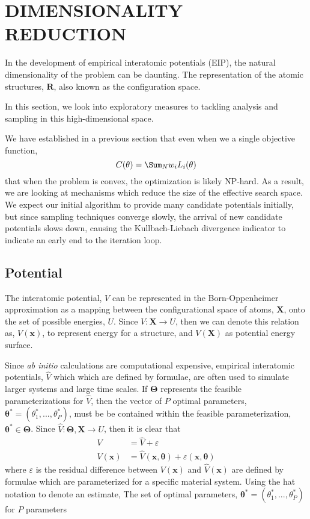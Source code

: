 \chapter{DIMENSIONALITY REDUCTION}

In the development of empirical interatomic potentials (EIP), the natural dimensionality of the problem can be daunting.  The representation of the atomic structures, $\bm{R}$, also known as the configuration space.

In this section, we look into exploratory measures to tackling analysis and sampling in this high-dimensional space.

We have established in a previous section that even when we a single objective function,
\begin{equation}
  C(\theta)=\Sum_N w_i L_i(\theta)
\end{equation}
that when the problem is convex, the optimization is likely NP-hard.
As a result, we are looking at mechanisms which reduce the size of the effective search space.
We expect our initial algorithm to provide many candidate potentials initially, but since sampling techniques converge slowly, the arrival of new candidate potentials slows down, causing the Kullbach-Liebach divergence indicator to indicate an early end to the iteration loop.

\section{Potential}

The interatomic potential, $V$ can be represented in the Born-Oppenheimer approximation as a mapping between the configurational space of atoms, $\bm{X}$, onto the set of possible energies, $U$.
Since $V:\bm{X} \rightarrow U$, then we can denote this relation as, $V(\bm{x})$, to represent energy for a structure, and $V(\bm{X})$ as potential energy surface.

Since \emph{ab initio} calculations are computational expensive, empirical interatomic potentials, $\hat{V}$ which which are defined by formulae, are often used to simulate larger systems and large time scales.
If $\bm{\Theta}$ represents the feasible parameterizations for $\hat{V}$, then the vector of $P$ optimal parameters, $\bm{\theta}^{*} = (\theta_1^{*},...,\theta_P^{*})$, must be be contained within the feasible parameterization, $\bm{\theta}^{*} \in \bm{\Theta}$.
Since $\hat{V}:\bm{\Theta},\bm{X} \rightarrow U$, then it is clear that
\begin{align}
  V &= \hat{V} + \varepsilon \\
  V(\bm{x}) &= \hat{V}(\bm{x},\bm{\theta}) + \varepsilon(\bm{x},\bm{\theta})
\end{align}
where $\varepsilon$ is the residual difference between $V(\bm{x})$ and $\hat{V}(\bm{x})$
 are defined by formulae which are parameterized for a specific material system.  Using the hat notation to denote an estimate,   The set of optimal parameters, $\bm{\theta}^{*} = (\theta_1^{*},...,\theta_P^{*})$ for $P$ parameters

